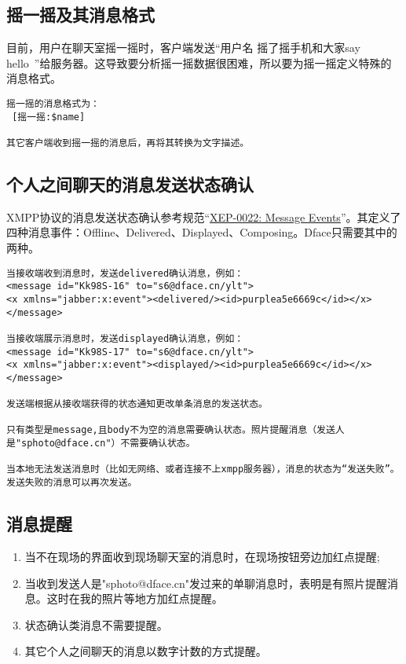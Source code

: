 \subsection{摇一摇及其消息格式}
目前，用户在聊天室摇一摇时，客户端发送“用户名 摇了摇手机和大家say hello~”给服务器。这导致要分析摇一摇数据很困难，所以要为摇一摇定义特殊的消息格式。

\begin{verbatim}
摇一摇的消息格式为：
 [摇一摇:$name]

其它客户端收到摇一摇的消息后，再将其转换为文字描述。
\end{verbatim}



\subsection{个人之间聊天的消息发送状态确认}
XMPP协议的消息发送状态确认参考规范“\href{http://xmpp.org/extensions/xep-0022.html}{XEP-0022: Message Events}”。其定义了四种消息事件：Offline、Delivered、Displayed、Composing。Dface只需要其中的两种。

\begin{verbatim}
当接收端收到消息时，发送delivered确认消息，例如：
<message id="Kk98S-16" to="s6@dface.cn/ylt">
<x xmlns="jabber:x:event"><delivered/><id>purplea5e6669c</id></x>
</message>

当接收端展示消息时，发送displayed确认消息，例如：
<message id="Kk98S-17" to="s6@dface.cn/ylt">
<x xmlns="jabber:x:event"><displayed/><id>purplea5e6669c</id></x>
</message>

发送端根据从接收端获得的状态通知更改单条消息的发送状态。

只有类型是message,且body不为空的消息需要确认状态。照片提醒消息（发送人是"sphoto@dface.cn"）不需要确认状态。

当本地无法发送消息时（比如无网络、或者连接不上xmpp服务器），消息的状态为“发送失败”。发送失败的消息可以再次发送。

\end{verbatim}

\subsection{消息提醒}
\begin{enumerate}
\item 当不在现场的界面收到现场聊天室的消息时，在现场按钮旁边加红点提醒;
\item 当收到发送人是"sphoto@dface.cn"发过来的单聊消息时，表明是有照片提醒消息。这时在我的照片等地方加红点提醒。
\item 状态确认类消息不需要提醒。
\item 其它个人之间聊天的消息以数字计数的方式提醒。
\end{enumerate}


